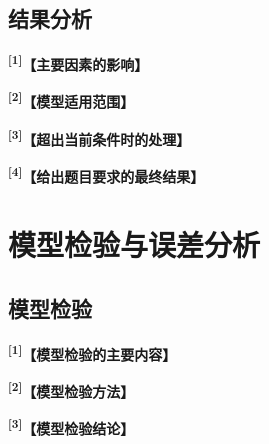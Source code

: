 \documentclass[UTF8,a4paper,12pt,fontset=fandol]{ctexart}
\newif\ifDraftAid
\newcommand{\ph}[1]{\textbf{\color{phg}【#1】}}
\newcommand{\detail}[1]{%
  \ifDraftAid\textnormal{\color{detailg}\small\,（参考写法：#1）}\fi}
\newcommand{\PHD}[2]{\ph{#1}\detail{#2}}
\newcommand{\SN}[1]{\textsuperscript{\color{noteg}\bfseries[#1]}}
\newcommand{\Note}[2]{\par\noindent\textbf{[#1]}\ #2}
\newcommand{\Annotated}[2]{%
\ifDraftAid
\noindent\begin{minipage}[t]{0.735\linewidth}\vspace{0pt}#1\end{minipage}\hfill
\begin{minipage}[t]{0.235\linewidth}\vspace{0pt}\footnotesize\color{noteg}\raggedright
\begin{tcolorbox}[colback=notebg,colframe=ruleg,boxrule=0.35pt,arc=1mm,left=1.2mm,right=1.2mm,top=1mm,bottom=1mm]
#2
\end{tcolorbox}\end{minipage}
\else
#1
\fi
}
\numberwithin{figure}{section}
\numberwithin{table}{section}
\begin{document}
\subsection{结果分析}
\Annotated{
\SN{1}\PHD{主要因素的影响}{由〔特征重要性、敏感性或贡献度结果〕可知，〔因素A〕对〔结果〕的影响较大，且随其增大，〔结果〕呈现〔上升、下降或其他规律〕；〔因素B〕的影响主要体现在〔范围〕。这一变化趋势与〔相关机理或实际经验〕基本一致，说明模型能够较好地捕捉〔主要规律〕。}

\par\medskip
\SN{2}\PHD{模型适用范围}{在〔条件或参数范围〕内，模型的〔误差或主要指标〕基本保持稳定；当〔条件〕继续变化时，〔指标〕开始明显下降。因此，本文主要在〔当前数据覆盖范围〕内讨论模型结果，并指出模型适用的边界条件。}

\par\medskip
\SN{3}\PHD{超出当前条件时的处理}{当〔变量或工况〕超过〔范围〕后，模型误差明显增大。对于这类情况，可通过补充〔相应数据〕、重新估计〔有关参数〕或重新训练模型后再进行判断，而不直接沿用当前结果。}

\par\medskip
\SN{4}\PHD{给出题目要求的最终结果}{综合上述分析，在〔条件1〕下得到〔结果或方案A〕；在〔条件2〕下得到〔结果或方案B〕。因此，根据题目给定的〔实际条件〕，最终可确定〔需要提交的分类、预测、路径、方案或其他结果〕。}
}{
\Note{1}{分析变量影响时，尽量同时给出影响大小、变化方向及可能原因。}
\Note{2}{若能从实验中得到范围或阈值，可在此给出。}
\Note{3}{超出当前数据范围时，说明需要补充哪些数据或重新进行哪些计算。}
\Note{4}{问题四最后应直接给出题目要求的分类、预测、路径或方案。}
}

\section{模型检验与误差分析}
\subsection{模型检验}
\Annotated{
\SN{1}\PHD{模型检验的主要内容}{为检验模型结果的可靠性，本文分别从预测误差、结果稳定性和实际合理性三个方面进行分析。前两者考察模型在不同数据或参数下的表现，后者主要比较模型结果与〔理论规律或实际现象〕是否一致。}

\par\medskip
\SN{2}\PHD{模型检验方法}{首先采用〔测试集、交叉验证或滚动预测〕计算〔误差或评价指标〕；随后通过〔重复实验、Bootstrap 或参数扰动〕观察结果波动；最后将〔关键结果〕与〔理论范围、已知规律或外部数据〕进行比较。}

\par\medskip
\SN{3}\PHD{模型检验结论}{结果表明，在〔当前数据范围或参数区间〕内，模型的〔主要指标〕保持在〔范围〕，主要变化规律基本一致。因此，本文认为模型在题目给定条件下具有较好的稳定性和适用性。}
}{
\Note{1}{根据题目选择两种或以上相互补充的检验方法即可。}
\Note{2}{每项检验都给出相应指标、图表或比较结果。}
\Note{3}{检验结论限定在题目数据和参数范围内。}
}
\end{document}
